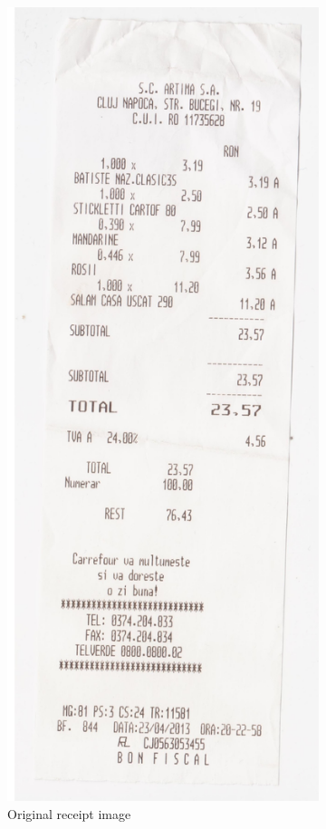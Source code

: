 \begin{figure}
\centering
\begin{subfigure}{0.49\linewidth}
  \centering
  \includegraphics[width=.6\linewidth]{img/original.jpg}
  \caption{Original receipt image}
  \label{fig:orig_image}
\end{subfigure}
\begin{subfigure}{0.49\linewidth}
  \centering

\end{subfigure}
\end{figure}

